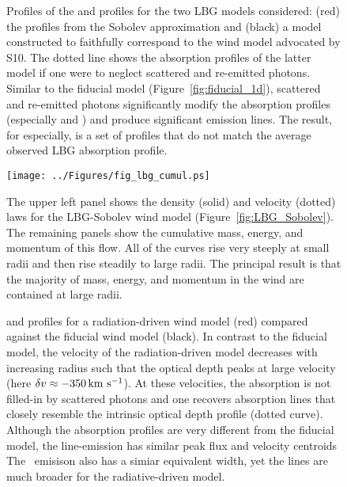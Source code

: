 \documentclass[12pt,preprint]{aastex}
\begin{document}
\clearpage

\begin{figure}
\caption{
Profiles of the  and  profiles for the two
LBG models considered: (red) the profiles from the 
Sobolev approximation 
and (black) a model constructed to faithfully
correspond to the wind model advocated by S10.  The dotted line
shows the absorption profiles of the latter model if one were
to neglect scattered and re-emitted photons.  Similar to the fiducial
model (Figure~\ref{fig:fiducial_1d}), scattered and re-emitted photons
significantly modify the absorption profiles (especially 
and \feiib)
and produce significant emission lines.  
The result, for  especially, is a set of profiles that do
not match the average observed LBG absorption profile.
}
\label{fig:LBG_spec}
\end{figure}

\begin{figure}
\texttt{[image: ../Figures/fig\_lbg\_cumul.ps]}
\caption{
The upper left panel shows the density (solid) and velocity (dotted)
laws for the LBG-Sobolev wind model (Figure~\ref{fig:LBG_Sobolev}).
The remaining panels show the cumulative mass, energy, and momentum of
this flow.  All of the curves rise very steeply at small radii and
then rise steadily to large radii.  The principal result is that the
majority of mass, energy, and momentum in the wind are contained at
large radii.
}
\label{fig:LBG_cumul}
\end{figure}



\begin{figure}
\caption{
 and 
profiles for a radiation-driven wind model (red) compared against the
fiducial wind model (black).  In contrast to the fiducial model, the
velocity of the radiation-driven model decreases with increasing
radius such that the optical depth peaks at large velocity (here $\delta v
\approx -350 \, {\rm km~s^{-1}}$).  At these velocities, the absorption is not
filled-in by scattered photons and one recovers absorption lines
that closely resemble the intrinsic optical depth profile (dotted
curve).  Although the  absorption profiles are very
different from the fiducial model, the  line-emission has
similar peak flux and velocity centroids 
The \feiis\ emisison also has a simiar
equivalent width, yet the lines are much broader for the
radiative-driven model. 
}
\label{fig:rad_spec}
\end{figure}
\end{document}
